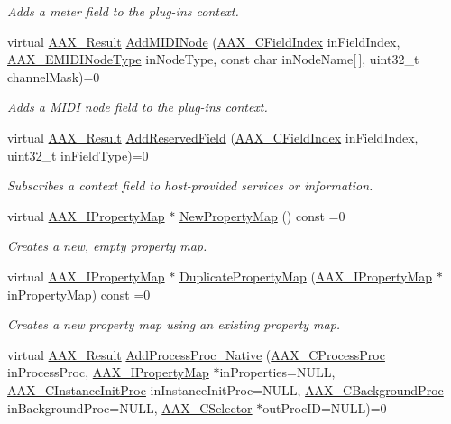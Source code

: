 \begin{DoxyCompactItemize}
\begin{DoxyCompactList}\small\item\em Adds a meter field to the plug-\/in\textquotesingle{}s context. \end{DoxyCompactList}\item 
virtual \hyperlink{a00149_a4d8f69a697df7f70c3a8e9b8ee130d2f}{A\+A\+X\+\_\+\+Result} \hyperlink{a00088_a6284dda9ccca898e33075de29dad4e39}{Add\+M\+I\+D\+I\+Node} (\hyperlink{a00149_ae807f8986143820cfb5d6da32165c9c7}{A\+A\+X\+\_\+\+C\+Field\+Index} in\+Field\+Index, \hyperlink{a00206_a5e1dffce35d05990dbbad651702678e4}{A\+A\+X\+\_\+\+E\+M\+I\+D\+I\+Node\+Type} in\+Node\+Type, const char in\+Node\+Name\mbox{[}$\,$\mbox{]}, uint32\+\_\+t channel\+Mask)=0
\begin{DoxyCompactList}\small\item\em Adds a M\+I\+D\+I node field to the plug-\/in\textquotesingle{}s context. \end{DoxyCompactList}\item 
virtual \hyperlink{a00149_a4d8f69a697df7f70c3a8e9b8ee130d2f}{A\+A\+X\+\_\+\+Result} \hyperlink{a00088_a4d0701bda5948e19f0629ffe309ac678}{Add\+Reserved\+Field} (\hyperlink{a00149_ae807f8986143820cfb5d6da32165c9c7}{A\+A\+X\+\_\+\+C\+Field\+Index} in\+Field\+Index, uint32\+\_\+t in\+Field\+Type)=0
\begin{DoxyCompactList}\small\item\em Subscribes a context field to host-\/provided services or information. \end{DoxyCompactList}\item 
virtual \hyperlink{a00112}{A\+A\+X\+\_\+\+I\+Property\+Map} $\ast$ \hyperlink{a00088_a0d7dd21daa8bc588d6a1145c3eb7ef98}{New\+Property\+Map} () const =0
\begin{DoxyCompactList}\small\item\em Creates a new, empty property map. \end{DoxyCompactList}\item 
virtual \hyperlink{a00112}{A\+A\+X\+\_\+\+I\+Property\+Map} $\ast$ \hyperlink{a00088_a107f2d11ba9165ef84162a76368f6ee6}{Duplicate\+Property\+Map} (\hyperlink{a00112}{A\+A\+X\+\_\+\+I\+Property\+Map} $\ast$in\+Property\+Map) const =0
\begin{DoxyCompactList}\small\item\em Creates a new property map using an existing property map. \end{DoxyCompactList}\item 
virtual \hyperlink{a00149_a4d8f69a697df7f70c3a8e9b8ee130d2f}{A\+A\+X\+\_\+\+Result} \hyperlink{a00088_a1c069508cf54a523905c8160ebf628ad}{Add\+Process\+Proc\+\_\+\+Native} (\hyperlink{a00163_ad6dd5e1aa5bd2f8462966685e3b26a6e}{A\+A\+X\+\_\+\+C\+Process\+Proc} in\+Process\+Proc, \hyperlink{a00112}{A\+A\+X\+\_\+\+I\+Property\+Map} $\ast$in\+Properties=N\+U\+L\+L, \hyperlink{a00163_a3963a850079d3186e08c97a1a4d0ef1c}{A\+A\+X\+\_\+\+C\+Instance\+Init\+Proc} in\+Instance\+Init\+Proc=N\+U\+L\+L, \hyperlink{a00163_aa64561d963284a3124a0821e7dc79c9a}{A\+A\+X\+\_\+\+C\+Background\+Proc} in\+Background\+Proc=N\+U\+L\+L, \hyperlink{a00149_aeaf9b387f902c50a8360ff423f4a1f23}{A\+A\+X\+\_\+\+C\+Selector} $\ast$out\+Proc\+I\+D=N\+U\+L\+L)=0

\end{DoxyCompactItemize}
